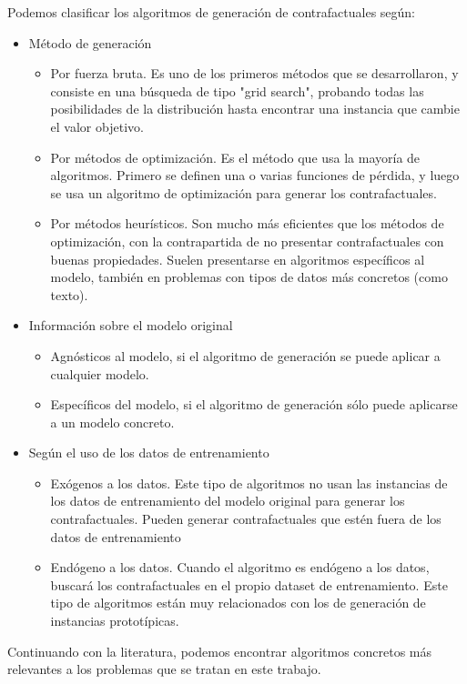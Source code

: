 \documentclass[12pt]{report} %
\begin{document}
Podemos clasificar los algoritmos de generación de contrafactuales según:
\begin{itemize}
    \item Método de generación
          \begin{itemize}
              \item Por fuerza bruta. Es uno de los primeros métodos que se desarrollaron, y consiste en una búsqueda de tipo "grid search", probando todas las posibilidades de la distribución hasta encontrar una instancia que cambie el valor objetivo.
              \item Por métodos de optimización. Es el método que usa la mayoría de algoritmos. Primero se definen una o varias funciones de pérdida, y luego se usa un algoritmo de optimización para generar los contrafactuales.
              \item Por métodos heurísticos. Son mucho más eficientes que los métodos de optimización, con la contrapartida de no presentar contrafactuales con buenas propiedades. Suelen presentarse en algoritmos específicos al modelo, también en problemas con tipos de datos más concretos (como texto).
          \end{itemize}
    \item Información sobre el modelo original
          \begin{itemize}
              \item Agnósticos al modelo, si el algoritmo de generación se puede aplicar a cualquier modelo.
              \item Específicos del modelo, si el algoritmo de generación sólo puede aplicarse a un modelo concreto.
          \end{itemize}
    \item Según el uso de los datos de entrenamiento
          \begin{itemize}
              \item Exógenos a los datos. Este tipo de algoritmos no usan las instancias de los datos de entrenamiento del modelo original para generar los contrafactuales. Pueden generar contrafactuales que estén fuera de los datos de entrenamiento
              \item Endógeno a los datos. Cuando el algoritmo es endógeno a los datos, buscará los contrafactuales en el propio dataset de entrenamiento. Este tipo de algoritmos están muy relacionados con los de generación de instancias prototípicas.
          \end{itemize}
\end{itemize}
Continuando con la literatura, podemos encontrar algoritmos concretos más relevantes a los problemas que se tratan en este trabajo.
\end{document}
